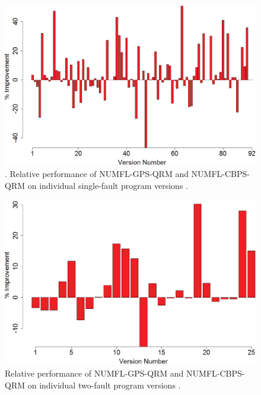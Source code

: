 \begin{figure}[!thpb]
\centering
\includegraphics[width=\textwidth]{CBPS_VS_GPS.eps}
\caption{. Relative performance of NUMFL-GPS-QRM and NUMFL-CBPS-QRM on individual single-fault program versions .}
\label{CBPS_VS_GPS}
\end{figure}

\begin{figure}[!thpb]
\centering
\includegraphics[width=\textwidth]{CBPS_VS_GPS_MultipleFault.eps}
\caption{Relative performance of NUMFL-GPS-QRM and NUMFL-CBPS-QRM on individual two-fault program versions .}
\label{CBPS_VS_GPS_MultipleFault}
\end{figure}

